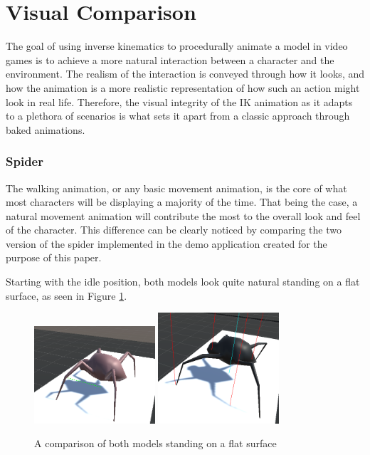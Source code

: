 \section{Visual Comparison}
The goal of using inverse kinematics to procedurally animate a model in video
games is to achieve a more natural interaction between a character and the
environment. The realism of the interaction is conveyed through how it looks,
and how the animation is a more realistic representation of how such an action
might look in real life. Therefore, the visual integrity of the IK animation as
it adapts to a plethora of scenarios is what sets it apart from a classic
approach through baked animations. 

\subsubsection{Spider}
The walking animation, or any basic movement animation, is the core of what
most characters will be displaying a majority of the time. That being the case,
a natural movement animation will contribute the most to the overall look and
feel of the character. This difference can be clearly noticed by comparing the
two version of the spider implemented in the demo application created for the
purpose of this paper. 

Starting with the idle position, both models look quite natural standing on
a flat surface, as seen in Figure \ref{fig:sp_flat}.


\begin{figure}[h!]
    \centering
    \captionsetup{justification=centering}
    \includegraphics[width=0.4\textwidth]{grafika/sp_b_flat.png}
    \includegraphics[width=0.4\textwidth]{grafika/sp_ik_flat.png}
    \caption{A comparison of both models standing on a flat surface}
    \label{fig:sp_flat}
\end{figure}

